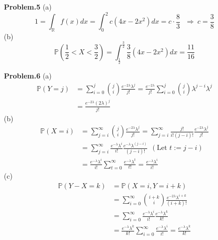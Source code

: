\documentclass[a4paper, 11pt]{article}
\begin{document}
\begin{itemize}
	\item[\textbf{Problem.5}] (a)
	\begin{equation}
		1=\int_{\mathbb{R}}f(x)dx=\int_{0}^2 c(4x-2x^2)dx = c\cdot\frac{8}{3} ~~~\Rightarrow~ c=\frac{3}{8}
	\end{equation}
	(b) \begin{equation}
		\mathbb{P}\left(\frac{1}{2}<X<\frac{3}{2}\right)=\int_{\frac{1}{2}}^{\frac{3}{2}} \frac{3}{8}(4x-2x^2)dx=\frac{11}{16}
	\end{equation}
\end{itemize}

\begin{itemize}
	\item[\textbf{Problem.6}] (a) 
	\begin{equation}
		\begin{split}
			\mathbb{P}\left(Y=j\right)&=\sum_{i=0}^j \binom{j}{i}\frac{e^{-2\lambda}\lambda^j}{j!}=\frac{e^{-2\lambda}}{j!}\sum_{i=0}^j \binom{j}{i}\lambda^{j-i}\lambda^{j}\\
			& = \frac{e^{-2\lambda}(2\lambda)^{j}}{j!}
		\end{split}
	\end{equation}
	(b) 
	\begin{equation}
		\begin{split}
			\mathbb{P}\left(X=i\right)&=\sum_{j=i}^{\infty} \binom{j}{i}\frac{e^{-2\lambda}\lambda^j}{j!}=\sum_{j=i}^{\infty} \frac{j!}{i!(j-i)!}\frac{e^{-2\lambda}\lambda^j}{j!}\\
			&=\sum_{j=i}^{\infty} \frac{e^{-\lambda}\lambda^i}{i!}\frac{e^{-\lambda}\lambda^{(j-i)}}{(j-i)!}~~(\text{Let $t:=j-i$})\\
			&=\frac{e^{-\lambda}\lambda^i}{i!}\sum_{t=0}^{\infty} \frac{e^{-\lambda}\lambda^t}{t!}=\frac{e^{-\lambda}\lambda^i}{i!}
		\end{split}
	\end{equation}
	(c) 
	\begin{equation}
	 	\begin{split}
	 		\mathbb{P}\left(Y-X=k\right)&=\mathbb{P}\left(X=i,Y=i+k\right)\\
	 		&=\sum_{i=0}^{\infty}\binom{i+k}{i}\frac{e^{-2\lambda}\lambda^{i+k}}{(i+k)!}\\
	 		&=\sum_{i=0}^{\infty} \frac{e^{-\lambda}\lambda^i}{i!}\frac{e^{-\lambda}\lambda^{k}}{k!}\\
	 		&=\frac{e^{-\lambda}\lambda^{k}}{k!}\sum_{i=0}^{\infty} \frac{e^{-\lambda}\lambda^i}{i!}=\frac{e^{-\lambda}\lambda^{k}}{k!}
	 	\end{split}
	\end{equation} 
\end{itemize}
\end{document}
